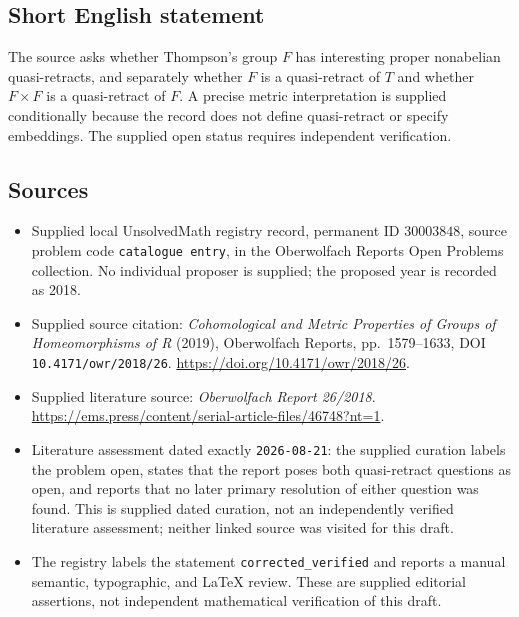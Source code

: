 \documentclass[11pt]{article}
\begin{document}
\subsection{Short English statement}
The source asks whether Thompson's group \(F\) has interesting proper nonabelian quasi-retracts, and separately whether \(F\) is a quasi-retract of \(T\) and whether \(F\times F\) is a quasi-retract of \(F\). A precise metric interpretation is supplied conditionally because the record does not define quasi-retract or specify embeddings. The supplied open status requires independent verification.
\subsection{Sources}
\begin{itemize}
\item Supplied local UnsolvedMath registry record, permanent ID \(30003848\), source problem code \texttt{catalogue entry}, in the Oberwolfach Reports Open Problems collection. No individual proposer is supplied; the proposed year is recorded as 2018.
\item Supplied source citation: \emph{Cohomological and Metric Properties of Groups of Homeomorphisms of R} (2019), Oberwolfach Reports, pp.\ 1579--1633, DOI \texttt{10.4171/owr/2018/26}. \url{https://doi.org/10.4171/owr/2018/26}.
\item Supplied literature source: \emph{Oberwolfach Report 26/2018}. \url{https://ems.press/content/serial-article-files/46748?nt=1}.
\item Literature assessment dated exactly \texttt{2026-08-21}: the supplied curation labels the problem open, states that the report poses both quasi-retract questions as open, and reports that no later primary resolution of either question was found. This is supplied dated curation, not an independently verified literature assessment; neither linked source was visited for this draft.
\item The registry labels the statement \texttt{corrected\_verified} and reports a manual semantic, typographic, and LaTeX review. These are supplied editorial assertions, not independent mathematical verification of this draft.
\end{itemize}
\end{document}
